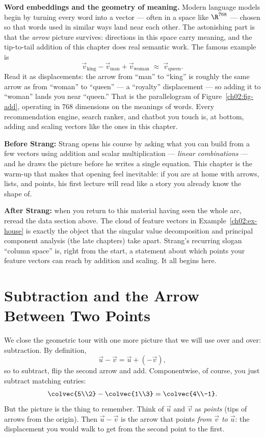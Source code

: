 \begin{applicationbox}
\textbf{Word embeddings and the geometry of meaning.} Modern language models begin by
turning every word into a vector --- often in a space like $\R^{768}$ --- chosen so that
words used in similar ways land near each other. The astonishing part is that the
\emph{arrow} picture survives: directions in this space carry meaning, and the
tip-to-tail addition of this chapter does real semantic work. The famous example is
\[
  \vec{v}_{\text{king}} - \vec{v}_{\text{man}} + \vec{v}_{\text{woman}}
  \;\approx\; \vec{v}_{\text{queen}}.
\]
Read it as displacements: the arrow from ``man'' to ``king'' is roughly the same arrow as
from ``woman'' to ``queen'' --- a ``royalty'' displacement --- so adding it to ``woman''
lands you near ``queen.'' That is the parallelogram of Figure~\ref{ch02:fig-add},
operating in $768$ dimensions on the meanings of words. Every recommendation engine,
search ranker, and chatbot you touch is, at bottom, adding and scaling vectors like the
ones in this chapter.
\end{applicationbox}

\begin{strangbox}
\textbf{Before Strang:} Strang opens his course by asking what you can build from a few
vectors using addition and scalar multiplication --- \emph{linear combinations} --- and
he draws the picture before he writes a single equation. This chapter is the warm-up that
makes that opening feel inevitable: if you are at home with arrows, lists, and points, his
first lecture will read like a story you already know the shape of.

\textbf{After Strang:} when you return to this material having seen the whole arc, reread
the data section above. The cloud of feature vectors in Example~\ref{ch02:ex-house} is
exactly the object that the singular value decomposition and principal component analysis
(the late chapters) take apart. Strang's recurring slogan ``column space'' is, right from
the start, a statement about which points your feature vectors can reach by addition and
scaling. It all begins here.
\end{strangbox}

\section{Subtraction and the Arrow Between Two Points}
\label{ch02:subtract}

We close the geometric tour with one more picture that we will use over and over:
subtraction. By definition,
\[
  \vec{u} - \vec{v} = \vec{u} + (-\vec{v}),
\]
so to subtract, flip the second arrow and add. Componentwise, of course, you just subtract
matching entries:
\[
  \colvec{5\\2} - \colvec{1\\3} = \colvec{4\\-1}.
\]
But the picture is the thing to remember. Think of $\vec{u}$ and $\vec{v}$ as
\emph{points} (tips of arrows from the origin). Then $\vec{u}-\vec{v}$ is the arrow that
points \emph{from $\vec{v}$ to $\vec{u}$}: the displacement you would walk to get from the
second point to the first.

